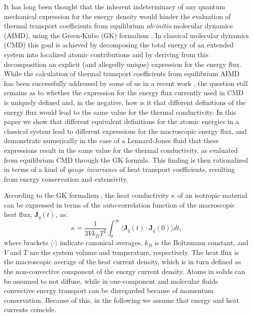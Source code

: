 \newpage 
It has long been thought that the inherent indeterminacy of
any quantum mechanical expression for the energy density would hinder
the evaluation of thermal transport coefficients from equilibrium
\emph{ab-initio} molecular dynamics (AIMD), using the Green-Kubo (GK)
formalism \cite{Green:1954,Kubo:1957,Kadanoff:1963,Forster}.  In
classical molecular dynamics (CMD) this goal is achieved by
decomposing the total energy of an extended system into localized
atomic contributions and by deriving from this decomposition an
explicit (and allegedly unique) expression for the energy flux. While
the calculation of thermal transport coefficients from equilibrium
AIMD has been successfully addressed by some of us in a recent work
\cite{Marcolongo:2015}, the question still remains as to whether the
expression for the energy flux currently used in CMD is uniquely
defined and, in the negative, how is it that different definitions of
the energy flux would lead to the same value for the thermal
conductivity. In this paper we show that different equivalent
definitions for the atomic energies in a classical system lead to
different expressions for the macroscopic energy flux, and demonstrate
numerically in the case of a Lennard-Jones fluid that these
expressions result in the same value for the thermal conductivity, as
evaluated from equilibrium CMD through the GK formula.  This finding
is then rationalized in terms of a kind of \emph{gauge invariance} of
heat transport coefficients, resulting from energy conservation and
extensivity.

According to the GK formalism
\cite{Green:1954,Kubo:1957,Kadanoff:1963,Forster}, the heat
conductivity $\kappa$ of an isotropic material can be expressed in
terms of the auto-correlation function of the macroscopic heat flux,
$\mathbf{J}_{q}(t)$, as:
\begin{equation}
  \kappa=\frac{1}{3Vk_{B}T^{2}}\int_{0}^{\infty}\langle
  \mathbf{J}_{q}(t) \cdot\mathbf{J}_{q}(0)\rangle
  dt,\label{eq:Green-Kubo} 
\end{equation}
where brackets $\langle\cdot\rangle$ indicate canonical averages,
$k_{B}$ is the Boltzmann constant, and $V$ and $T$ are the system
volume and temperature, respectively. The heat flux is the macroscopic
average of the heat current density, which is in turn defined as the
non-convective component of the energy current density. Atoms in
solids can be assumed to not diffuse, while in one-component and
molecular fluids convective energy transport can
be disregarded because of momentum conservation. Because of this, in
the following we assume that energy and heat currents coincide.

